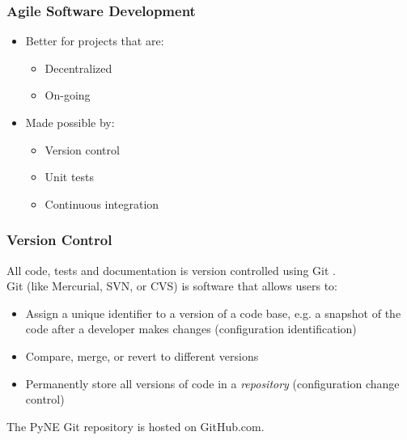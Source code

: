 \documentclass[12pt]{beamer}
\begin{document}
\begin{frame}
\frametitle{Agile Software Development}

\begin{itemize}
\item{Better for projects that are:}
    \begin{itemize}
    \item{Decentralized}
    \item{On-going}
    \end{itemize}
\item{Made possible by:}
    \begin{itemize}
    \item{Version control}
    \item{Unit tests}
    \item{Continuous integration}
    \end{itemize}
\end{itemize}

\end{frame}


\begin{frame}
\frametitle{Version Control}

All code, tests and documentation is version controlled using Git \cite{git}. \\
\vspace{0.3cm}
Git (like Mercurial, SVN, or CVS) is software that allows users to:
\begin{itemize}
\item{Assign a unique identifier to a version of a code base, e.g. a snapshot of 
      the code after a developer makes changes (\alert{configuration identification})}
\item{Compare, merge, or revert to different versions}
\item{Permanently store all versions of code in a \emph{repository} (\alert{configuration change control})}
\end{itemize}
\vspace{0.3cm}
The PyNE Git repository is hosted on GitHub.com.

\end{frame}
\end{document}

